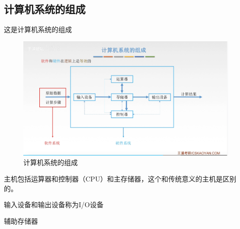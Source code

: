 \documentclass[12pt]{ctexart}
\begin{document}
\subsection{计算机系统的组成}
这是计算机系统的组成
\begin{figure}[htbp]
    \centering
    \includegraphics[scale=0.6]{计算机系统的组成.png}
    \caption{计算机系统的组成}
    \end{figure}
主机包括运算器和控制器（CPU）和主存储器，这个和传统意义的主机是区别的。

输入设备和输出设备称为I/O设备

辅助存储器
\end{document}

